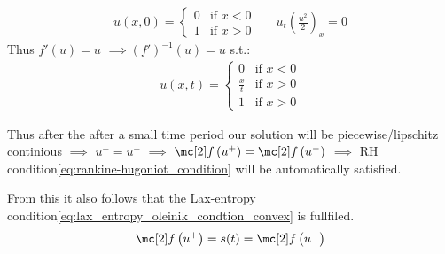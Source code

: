 \begin{examplebox}\nospacing
    \begin{example}\label{example:cor:rarefaction_solution_riemann_problem}
        \begin{align*}
          u(x,0)=
          \begin{cases}
              0 &\text{if }x<0\\
              1 &\text{if }x>0
          \end{cases}&&u_{t}\left(\frac{u^{2}}{2}\right)_{x}=0
        \end{align*}
        Thus $f'(u)=u$ $\implies (f')^{-1}(u)=u$ s.t.:
        \begin{align*}
          u(x,t)=
          \begin{cases}
              0 &\text{if }x<0\\
              \frac{x}{t} &\text{if }x>0\\
              1 &\text{if }x>0
          \end{cases}
        \end{align*}
        \begin{minipage}{0.4\textwidth}
            \begin{figure}[H]
                \centering{
                  \def\svgwidth{70pt}
                  \resizebox{\linewidth}{!}{}
                }
            \end{figure}
        \end{minipage}\hfill
        \begin{minipage}{0.55\textwidth}
            \begin{figure}[H]
                \centering{
                  \def\svgwidth{110pt}
                  \resizebox{\linewidth}{!}{}
                }
            \end{figure}
        \end{minipage}
        \begin{itemizenosep}
            \item Thus after the after a small time period our solution will be piecewise/lipschitz continious $\implies$ $u^{-}=u^{+}$  $\implies$
            $\flux\left(u^{+}\right)=\flux\left(u^{-}\right)$ $\implies$ RH condition\cref{eq:rankine-hugoniot_condition} will be automatically satisfied.
            \item From this it also follows that the Lax-entropy condition\cref{eq:lax_entropy_oleinik_condtion_convex} is fullfiled.
            \begin{align*}
              \flux\left(u^{+}\right)=s(t)=\flux\left(u^{-}\right)
            \end{align*}
        \end{itemizenosep}
    \end{example}
\end{examplebox}

